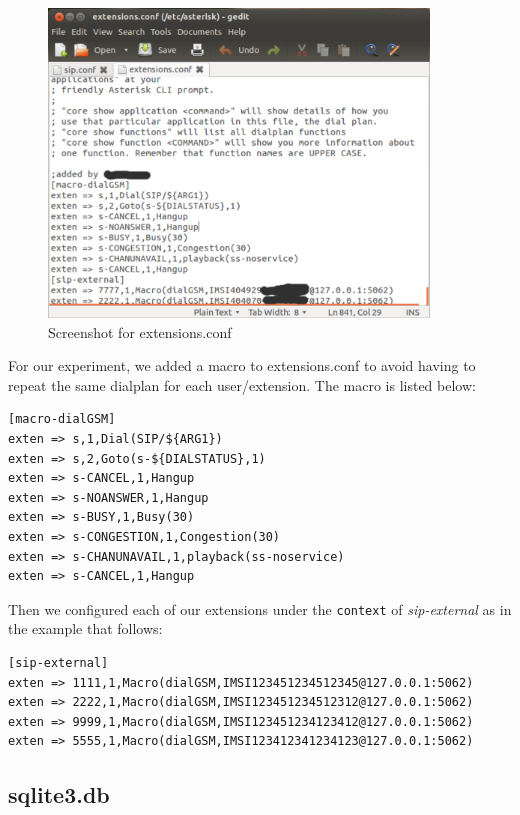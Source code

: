 \begin{figure}
  \centering
    \includegraphics[width=0.9\textwidth]{../images/ext_conf}
  \caption[Screenshot - extensions.conf]{Screenshot for \textsf{extensions.conf}}
  \label{ext_conf}
\end{figure}
For our experiment, we added a macro to \textsf{extensions.conf} to avoid
having to repeat the same dialplan for each user/extension. The macro is
listed below:
\begin{verbatim}
[macro-dialGSM]
exten => s,1,Dial(SIP/${ARG1})
exten => s,2,Goto(s-${DIALSTATUS},1)
exten => s-CANCEL,1,Hangup
exten => s-NOANSWER,1,Hangup
exten => s-BUSY,1,Busy(30)
exten => s-CONGESTION,1,Congestion(30)
exten => s-CHANUNAVAIL,1,playback(ss-noservice)
exten => s-CANCEL,1,Hangup
\end{verbatim}

Then we configured each of our extensions under the \texttt{context} of 
\textsl{sip-external} as in the example that follows: 
\begin{verbatim}
[sip-external]
exten => 1111,1,Macro(dialGSM,IMSI123451234512345@127.0.0.1:5062)
exten => 2222,1,Macro(dialGSM,IMSI123451234512312@127.0.0.1:5062)
exten => 9999,1,Macro(dialGSM,IMSI123451234123412@127.0.0.1:5062)
exten => 5555,1,Macro(dialGSM,IMSI123412341234123@127.0.0.1:5062)   
\end{verbatim}


\subsection{sqlite3.db}

